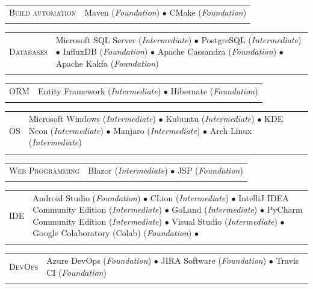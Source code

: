 \documentclass[english,10pt,a4paper]{article}
\newcommand{\BasicLevel}{{\footnotesize (\textit{Foundation})}}
\newcommand{\MediumLevel}{{\footnotesize (\textit{Intermediate})}}
\newcommand{\CvBullet}{\hspace{0.05cm} \textcolor{CvColor}{$\bullet$} \hspace{0.05cm}}
\newcommand{\CvDate}[1]{\textcolor{CvColor}{{\textsc{#1}}}}
\def\SidebarHSize{3.95cm}
\def\BodyHSize{12.5cm}
\begin{document}
		\begin{tabular}{p{\SidebarHSize}p{\BodyHSize}}
			\CvDate{Build automation} & Maven \BasicLevel \CvBullet CMake \BasicLevel \\\\
		\end{tabular}
		
		\begin{tabular}{p{\SidebarHSize}p{\BodyHSize}}
			\CvDate{Databases} & Microsoft SQL Server \MediumLevel \CvBullet PostgreSQL \MediumLevel \CvBullet InfluxDB \BasicLevel \CvBullet Apache Cassandra \BasicLevel \CvBullet Apache Kakfa \BasicLevel \\\\
		\end{tabular}
		
		\begin{tabular}{p{\SidebarHSize}p{\BodyHSize}}
			\CvDate{ORM} & Entity Framework \MediumLevel \CvBullet Hibernate \BasicLevel \\\\
		\end{tabular}
		
		\begin{tabular}{p{\SidebarHSize}p{\BodyHSize}}
			\CvDate{OS} & Microsoft Windows \MediumLevel \CvBullet Kubuntu \MediumLevel \CvBullet KDE Neon \MediumLevel \CvBullet Manjaro \MediumLevel \CvBullet Arch Linux \MediumLevel \\\\
		\end{tabular}
		
		\begin{tabular}{p{\SidebarHSize}p{\BodyHSize}}
			\CvDate{Web Programming} & Blazor \MediumLevel \CvBullet JSP \BasicLevel \\\\
		\end{tabular}
		
		\begin{tabular}{p{\SidebarHSize}p{\BodyHSize}}
			\CvDate{IDE} & Android Studio \BasicLevel \CvBullet CLion \MediumLevel \CvBullet IntelliJ IDEA Community Edition \MediumLevel \CvBullet GoLand \MediumLevel \CvBullet PyCharm Community Edition \MediumLevel \CvBullet Visual Studio \MediumLevel \CvBullet Google Colaboratory (Colab) \BasicLevel \CvBullet \\\\
		\end{tabular}
		
		\begin{tabular}{p{\SidebarHSize}p{\BodyHSize}}
			\CvDate{DevOps} & Azure DevOps \BasicLevel \CvBullet JIRA Software \BasicLevel \CvBullet Travis CI \BasicLevel \\\\
		\end{tabular}
		
\end{document}

